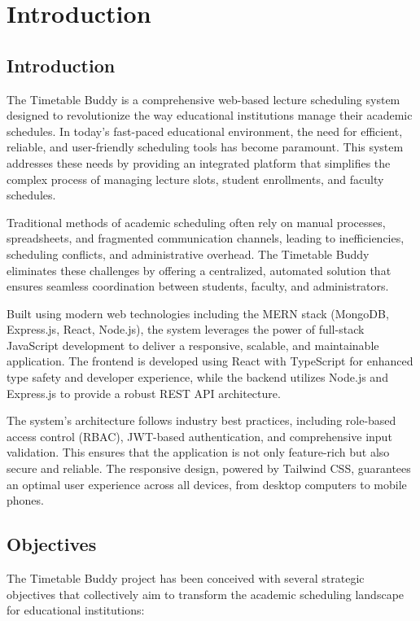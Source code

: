 \chapter{Introduction}

\section{Introduction}
The Timetable Buddy is a comprehensive web-based lecture scheduling system designed to revolutionize the way educational institutions manage their academic schedules. In today's fast-paced educational environment, the need for efficient, reliable, and user-friendly scheduling tools has become paramount. This system addresses these needs by providing an integrated platform that simplifies the complex process of managing lecture slots, student enrollments, and faculty schedules.

Traditional methods of academic scheduling often rely on manual processes, spreadsheets, and fragmented communication channels, leading to inefficiencies, scheduling conflicts, and administrative overhead. The Timetable Buddy eliminates these challenges by offering a centralized, automated solution that ensures seamless coordination between students, faculty, and administrators.

Built using modern web technologies including the MERN stack (MongoDB, Express.js, React, Node.js), the system leverages the power of full-stack JavaScript development to deliver a responsive, scalable, and maintainable application. The frontend is developed using React with TypeScript for enhanced type safety and developer experience, while the backend utilizes Node.js and Express.js to provide a robust REST API architecture.

The system's architecture follows industry best practices, including role-based access control (RBAC), JWT-based authentication, and comprehensive input validation. This ensures that the application is not only feature-rich but also secure and reliable. The responsive design, powered by Tailwind CSS, guarantees an optimal user experience across all devices, from desktop computers to mobile phones.

\section{Objectives}
The Timetable Buddy project has been conceived with several strategic objectives that collectively aim to transform the academic scheduling landscape for educational institutions:

